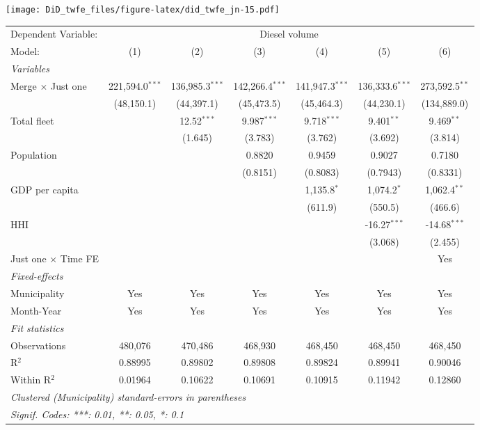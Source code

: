 \documentclass[
]{article}
\begin{document}
\texttt{[image: DiD\_twfe\_files/figure-latex/did\_twfe\_jn-15.pdf]}

\begin{tabular}{lcccccc}
\tabularnewline\midrule\midrule
Dependent Variable:&\multicolumn{6}{c}{Diesel volume}\\
Model:&(1) & (2) & (3) & (4) & (5) & (6)\\
\midrule \emph{Variables}&   &   &   &   &   &  \\
Merge $\times $ Just one & 221,594.0$^{***}$ & 136,985.3$^{***}$ & 142,266.4$^{***}$ & 141,947.3$^{***}$ & 136,333.6$^{***}$ & 273,592.5$^{**}$\\
  &(48,150.1) & (44,397.1) & (45,473.5) & (45,464.3) & (44,230.1) & (134,889.0)\\
Total fleet &    & 12.52$^{***}$ & 9.987$^{***}$ & 9.718$^{***}$ & 9.401$^{**}$ & 9.469$^{**}$\\
  &   & (1.645) & (3.783) & (3.762) & (3.692) & (3.814)\\
Population &    &    & 0.8820 & 0.9459 & 0.9027 & 0.7180\\
  &   &    & (0.8151) & (0.8083) & (0.7943) & (0.8331)\\
GDP per capita &    &    &    & 1,135.8$^{*}$ & 1,074.2$^{*}$ & 1,062.4$^{**}$\\
  &   &    &    & (611.9) & (550.5) & (466.6)\\
HHI &    &    &    &    & -16.27$^{***}$ & -14.68$^{***}$\\
  &   &    &    &    & (3.068) & (2.455)\\
Just one $\times$ Time FE &  &  &  &  &  & Yes\\
\midrule \emph{Fixed-effects}&   &   &   &   &   &  \\
Municipality & Yes & Yes & Yes & Yes & Yes & Yes\\
Month-Year & Yes & Yes & Yes & Yes & Yes & Yes\\
\midrule \emph{Fit statistics}&  & & & & & \\
Observations & 480,076&470,486&468,930&468,450&468,450&468,450\\
R$^2$ & 0.88995&0.89802&0.89808&0.89824&0.89941&0.90046\\
Within R$^2$ & 0.01964&0.10622&0.10691&0.10915&0.11942&0.12860\\
\midrule\midrule\multicolumn{7}{l}{\emph{Clustered (Municipality) standard-errors in parentheses}}\\
\multicolumn{7}{l}{\emph{Signif. Codes: ***: 0.01, **: 0.05, *: 0.1}}\\
\end{tabular}
\end{document}
